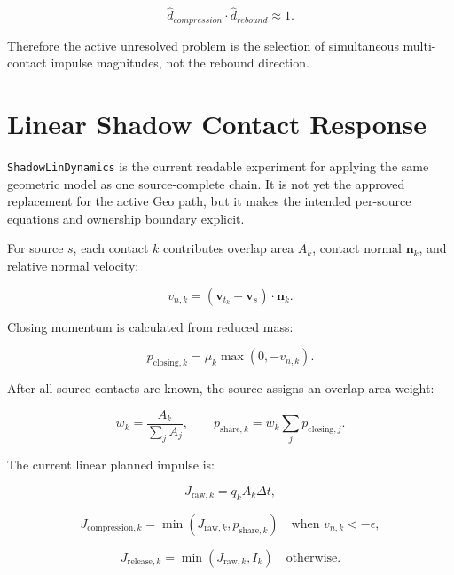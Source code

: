 \begin{equation}
\hat{d}_{compression}\cdot\hat{d}_{rebound} \approx 1.
\end{equation}

Therefore the active unresolved problem is the selection of simultaneous
multi-contact impulse magnitudes, not the rebound direction.

\section{Linear Shadow Contact Response}
\label{sec:linear-shadow-contact-response}

\texttt{ShadowLinDynamics} is the current readable experiment for applying the
same geometric model as one source-complete chain.  It is not yet the approved
replacement for the active Geo path, but it makes the intended per-source
equations and ownership boundary explicit.

For source \(s\), each contact \(k\) contributes overlap area \(A_k\), contact
normal \(\mathbf{n}_k\), and relative normal velocity:

\begin{equation}
v_{n,k} = (\mathbf{v}_{t_k}-\mathbf{v}_s)\cdot\mathbf{n}_k.
\end{equation}

Closing momentum is calculated from reduced mass:

\begin{equation}
p_{\mathrm{closing},k} = \mu_k \max(0,-v_{n,k}).
\end{equation}

After all source contacts are known, the source assigns an overlap-area weight:

\begin{equation}
w_k = \frac{A_k}{\sum_j A_j},
\qquad
p_{\mathrm{share},k} = w_k \sum_j p_{\mathrm{closing},j}.
\end{equation}

The current linear planned impulse is:

\begin{equation}
J_{\mathrm{raw},k}=q_k A_k\Delta t,
\end{equation}

\begin{equation}
J_{\mathrm{compression},k}
=
\min(J_{\mathrm{raw},k},p_{\mathrm{share},k})
\quad\text{when }v_{n,k}<-\epsilon,
\end{equation}

\begin{equation}
J_{\mathrm{release},k}
=
\min(J_{\mathrm{raw},k},I_k)
\quad\text{otherwise}.
\end{equation}

